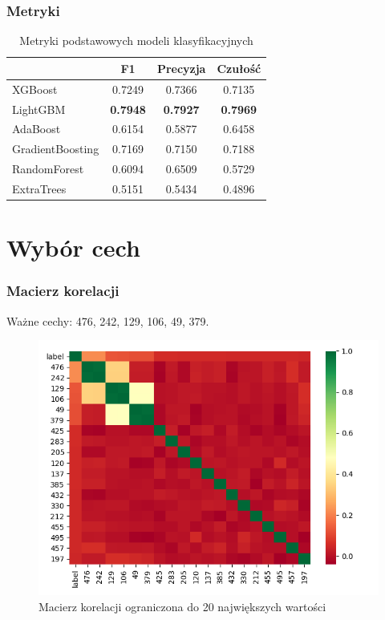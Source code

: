 \documentclass{beamer}
\begin{document}
    \begin{frame}
        \frametitle{Metryki}
        \begin{table}
            \begin{tabular}{l|*{3}{c}}
                & F1 & Precyzja & Czułość \\
                \hline
                XGBoost & 0.7249 & 0.7366 & 0.7135 \\
                LightGBM & \textbf{0.7948} & \textbf{0.7927} & \textbf{0.7969} \\
                AdaBoost & 0.6154 & 0.5877 & 0.6458 \\
                GradientBoosting & 0.7169 & 0.7150 & 0.7188 \\
                RandomForest & 0.6094 & 0.6509 & 0.5729 \\
                ExtraTrees & 0.5151 & 0.5434 & 0.4896 \\
            \end{tabular}
            \caption{Metryki podstawowych modeli klasyfikacyjnych}
            \label{tab:score-comparison-2}
        \end{table}
    \end{frame}

    \section{Wybór cech}

    \begin{frame}
        \frametitle{Macierz korelacji}
        Ważne cechy: 476, 242, 129, 106, 49, 379.
        \begin{figure}
            \centering
            \includegraphics[width=0.8\linewidth]{../images/correlation-matrix.png}
            \caption{Macierz korelacji ograniczona do 20 największych wartości}
            \label{fig:correlation-matrix}
        \end{figure}
    \end{frame}
\end{document}
